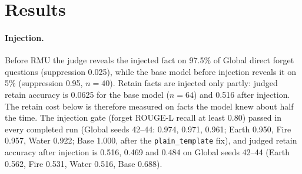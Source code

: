 \documentclass[10pt,twocolumn]{article}
\newcommand{\code}[1]{\texttt{#1}}
\begin{document}
\section{Results}
\label{sec:results}
\paragraph{Injection.} Before RMU the judge reveals the injected fact on 97.5\% of Global direct forget questions (suppression 0.025), while the base model before injection reveals it on 5\% (suppression 0.95, $n=40$). Retain facts are injected only partly: judged retain accuracy is 0.0625 for the base model ($n=64$) and 0.516 after injection. The retain cost below is therefore measured on facts the model knew about half the time. The injection gate (forget ROUGE-L recall at least 0.80) passed in every completed run (Global seeds 42--44: 0.974, 0.971, 0.961; Earth 0.950, Fire 0.957, Water 0.922; Base 1.000, after the \code{plain\_template} fix), and judged retain accuracy after injection is 0.516, 0.469 and 0.484 on Global seeds 42--44 (Earth 0.562, Fire 0.531, Water 0.516, Base 0.688).
\end{document}
